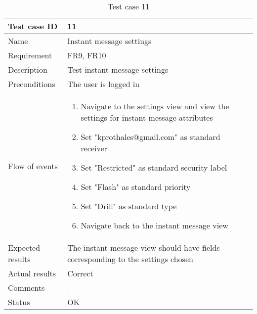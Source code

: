 		\begin{table}[htb]
			\begin{tabular}{l|p{10cm}}
				Test case ID & 11 \\ \hline
				Name & Instant message settings\\ \hline
				Requirement & FR9, FR10\\ \hline
				Description & Test instant message settings\\ \hline
				Preconditions & The user is logged in\\ \hline
				Flow of events & 
					\begin{enumerate}
						\item{}Navigate to the settings view and view the settings for instant message attributes
						\item{}Set "kprothales@gmail.com" as standard receiver
						\item{}Set "Restricted" as standard security label
						\item{}Set "Flash" as standard priority
						\item{}Set "Drill" as standard type
						\item{}Navigate back to the instant message view
					\end{enumerate} \\ \hline
				Expected results & The instant message view should have fields corresponding to the settings chosen \\ \hline
				Actual results &Correct\\ \hline
				Comments &-\\ \hline
				Status & OK\\ \hline
			\end{tabular}
			\caption{Test case 11} \label{tab:case11}
		\end{table}

